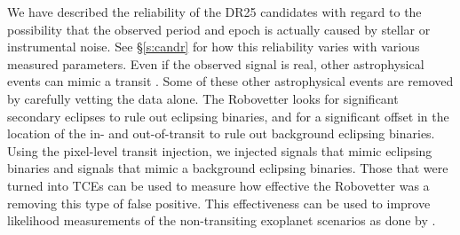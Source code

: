 We have described the reliability of the DR25 candidates with regard to the possibility that the observed period and epoch is actually caused by stellar or instrumental noise. See \S\ref{s:candr} for how this reliability varies with various measured parameters.  Even if the observed signal is real, other astrophysical events can mimic a transit \citep{Morton2016}. Some of these other astrophysical events are removed by carefully vetting the \Kepler{} data alone.  The Robovetter looks for significant secondary eclipses to rule out eclipsing binaries, and for a significant offset in the location of the in- and out-of-transit to rule out background eclipsing binaries.  Using the pixel-level transit injection, we injected signals that mimic eclipsing binaries and signals that mimic a background eclipsing binaries.  Those that were turned into TCEs can be used to measure how effective the Robovetter was a removing this type of false positive. This effectiveness can be used to improve likelihood measurements of the non-transiting exoplanet scenarios as done by \citet{Morton2016}.





